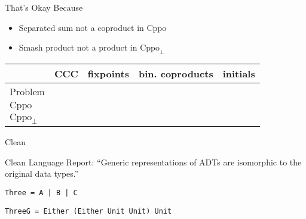 \documentclass{beamer}
\newcommand{\cmark}{\ding{51}}
\newcommand{\xmark}{\ding{55}}
\newcommand{\Cppo}{\text{Cppo}}
\begin{document}
\begin{frame}[fragile]{That's Okay Because}

\begin{itemize}
\item Separated sum not a coproduct in $\Cppo$
\item Smash product not a product in $\Cppo_\bot$
\end{itemize}
\vspace{1em}

\begin{center}
\begin{tabular}{l|c|c|c|c}
{} & CCC & fixpoints & bin. coproducts & initials \\
\hline
Problem & \cmark & \cmark & \cmark & \cmark \\
\hline
$\Cppo$ & \cmark & \cmark & \xmark & \xmark \\
\hline
$\Cppo_\bot$ & \xmark & \cmark & \cmark & \cmark \\
\end{tabular}
\end{center}

\end{frame}



\begin{frame}[fragile]{Clean}

Clean Language Report: ``Generic representations of ADTs are isomorphic to the original data types.''

\texttt{Three = A | B | C}


\texttt{ThreeG = Either (Either Unit Unit) Unit}


\end{frame}
\end{document}
